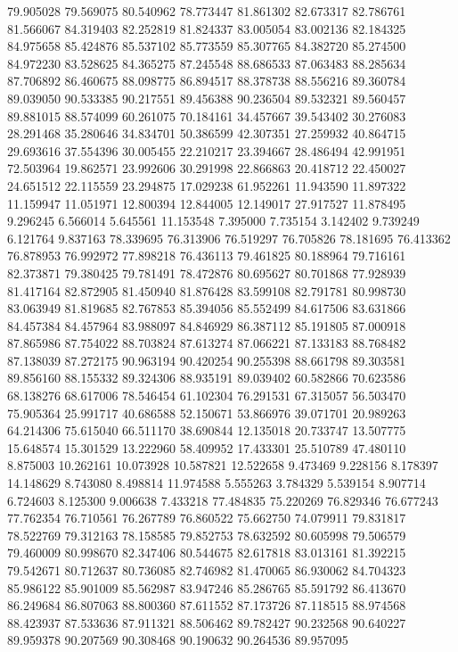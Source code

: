 79.905028
79.569075
80.540962
78.773447
81.861302
82.673317
82.786761
81.566067
84.319403
82.252819
81.824337
83.005054
83.002136
82.184325
84.975658
85.424876
85.537102
85.773559
85.307765
84.382720
85.274500
84.972230
83.528625
84.365275
87.245548
88.686533
87.063483
88.285634
87.706892
86.460675
88.098775
86.894517
88.378738
88.556216
89.360784
89.039050
90.533385
90.217551
89.456388
90.236504
89.532321
89.560457
89.881015
88.574099
60.261075
70.184161
34.457667
39.543402
30.276083
28.291468
35.280646
34.834701
50.386599
42.307351
27.259932
40.864715
29.693616
37.554396
30.005455
22.210217
23.394667
28.486494
42.991951
72.503964
19.862571
23.992606
30.291998
22.866863
20.418712
22.450027
24.651512
22.115559
23.294875
17.029238
61.952261
11.943590
11.897322
11.159947
11.051971
12.800394
12.844005
12.149017
27.917527
11.878495
9.296245
6.566014
5.645561
11.153548
7.395000
7.735154
3.142402
9.739249
6.121764
9.837163
78.339695
76.313906
76.519297
76.705826
78.181695
76.413362
76.878953
76.992972
77.898218
76.436113
79.461825
80.188964
79.716161
82.373871
79.380425
79.781491
78.472876
80.695627
80.701868
77.928939
81.417164
82.872905
81.450940
81.876428
83.599108
82.791781
80.998730
83.063949
81.819685
82.767853
85.394056
85.552499
84.617506
83.631866
84.457384
84.457964
83.988097
84.846929
86.387112
85.191805
87.000918
87.865986
87.754022
88.703824
87.613274
87.066221
87.133183
88.768482
87.138039
87.272175
90.963194
90.420254
90.255398
88.661798
89.303581
89.856160
88.155332
89.324306
88.935191
89.039402
60.582866
70.623586
68.138276
68.617006
78.546454
61.102304
76.291531
67.315057
56.503470
75.905364
25.991717
40.686588
52.150671
53.866976
39.071701
20.989263
64.214306
75.615040
66.511170
38.690844
12.135018
20.733747
13.507775
15.648574
15.301529
13.222960
58.409952
17.433301
25.510789
47.480110
8.875003
10.262161
10.073928
10.587821
12.522658
9.473469
9.228156
8.178397
14.148629
8.743080
8.498814
11.974588
5.555263
3.784329
5.539154
8.907714
6.724603
8.125300
9.006638
7.433218
77.484835
75.220269
76.829346
76.677243
77.762354
76.710561
76.267789
76.860522
75.662750
74.079911
79.831817
78.522769
79.312163
78.158585
79.852753
78.632592
80.605998
79.506579
79.460009
80.998670
82.347406
80.544675
82.617818
83.013161
81.392215
79.542671
80.712637
80.736085
82.746982
81.470065
86.930062
84.704323
85.986122
85.901009
85.562987
83.947246
85.286765
85.591792
86.413670
86.249684
86.807063
88.800360
87.611552
87.173726
87.118515
88.974568
88.423937
87.533636
87.911321
88.506462
89.782427
90.232568
90.640227
89.959378
90.207569
90.308468
90.190632
90.264536
89.957095
